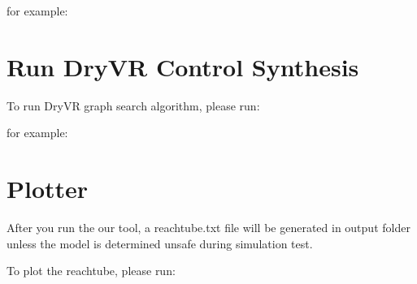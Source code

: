\documentclass[letterpaper,10pt,english]{sphinxmanual}
\begin{document}
for example:

\begin{sphinxVerbatim}[commandchars=\\\{\}]
  
\end{sphinxVerbatim}


\section{Run DryVR Control Synthesis}
\label{\detokenize{usage:run-dryvr-control-synthesis}}
To run DryVR graph search algorithm, please run:

\begin{sphinxVerbatim}[commandchars=\\\{\}]
  \PYG{p}{[}\PYG{p}{]}
\end{sphinxVerbatim}

for example:

\begin{sphinxVerbatim}[commandchars=\\\{\}]
  
\end{sphinxVerbatim}


\section{Plotter}
\label{\detokenize{usage:plotter}}
After you run the our tool, a reachtube.txt file will be generated in output folder unless the model is determined unsafe during simulation test.

To plot the reachtube, please run:

\begin{sphinxVerbatim}[commandchars=\\\{\}]
   \PYG{p}{[}  \PYG{p}{]}  \PYG{p}{[}   \PYG{p}{]}  \PYG{p}{[}  \PYG{p}{]}  \PYG{p}{[}  \PYG{p}{]}
\end{sphinxVerbatim}
\end{document}
